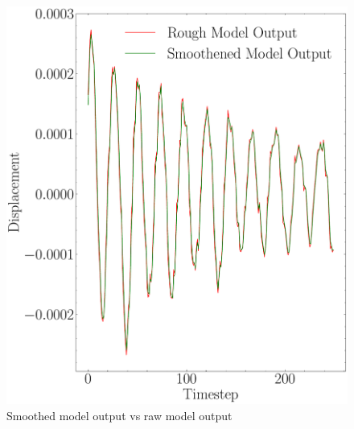 \begin{figure}[H]
    \centering
    \includegraphics[scale=0.25]{images/fig_chapter4/nn_related/rough_mo_smooth_mo.pdf}
    \caption{Smoothed model output vs raw model output}
    \label{fig:rough_mo_smooth_mo}
\end{figure}

